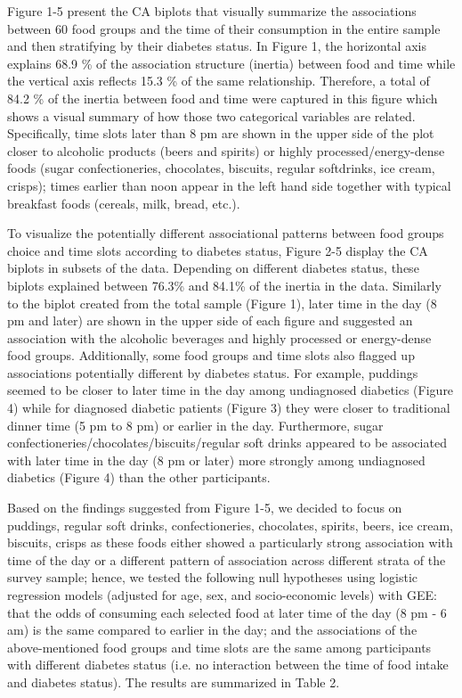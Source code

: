 \documentclass{bmcart}
\def\texttt{[image: ]}
\begin{document}
Figure 1-5 present the CA biplots that visually summarize the associations between 60 food groups and the time of their consumption in the entire sample and then stratifying by their diabetes status. In Figure 1, the horizontal axis explains 68.9 \% of the association structure (inertia) between food and time while the vertical axis reflects 15.3 \% of the same relationship. Therefore, a total of 84.2 \% of the inertia between food and time were captured in this figure which shows a visual summary of how those two categorical variables are related. Specifically, time slots later than 8 pm are shown in the upper side of the plot closer to alcoholic products (beers and spirits) or highly processed/energy-dense foods (sugar confectioneries, chocolates, biscuits, regular softdrinks, ice cream, crisps); times earlier than noon appear in the left hand side together with typical breakfast foods (cereals, milk, bread, etc.).



To visualize the potentially different associational patterns between food groups choice and time slots according to diabetes status, Figure 2-5 display the CA biplots in subsets of the data. Depending on different diabetes status, these biplots explained between 76.3\% and 84.1\% of the inertia in the data. Similarly to the biplot created from the total sample (Figure 1), later time in the day (8 pm and later) are shown in the upper side of each figure and suggested an association with the alcoholic beverages and highly processed or energy-dense food groups. Additionally, some food groups and time slots also flagged up associations potentially different by diabetes status. For example, puddings seemed to be closer to later time in the day among undiagnosed diabetics (Figure 4) while for diagnosed diabetic patients (Figure 3) they were closer to traditional dinner time (5 pm to 8 pm) or earlier in the day. Furthermore, sugar confectioneries/chocolates/biscuits/regular soft drinks appeared to be associated with later time in the day (8 pm or later) more strongly among undiagnosed diabetics (Figure 4) than the other participants.

Based on the findings suggested from Figure 1-5, we decided to focus on puddings, regular soft drinks, confectioneries, chocolates, spirits, beers, ice cream, biscuits, crisps as these foods either showed a particularly strong association with time of the day or a different pattern of association across different strata of the survey sample; hence, we tested the following null hypotheses using logistic regression models (adjusted for age, sex, and socio-economic levels) with GEE: that the odds of consuming each selected food at later time of the day (8 pm - 6 am) is the same compared to earlier in the day; and the associations of the above-mentioned food groups and time slots are the same among participants with different diabetes status (i.e. no interaction between the time of food intake and diabetes status). The results are summarized in Table 2. 
\end{document}
